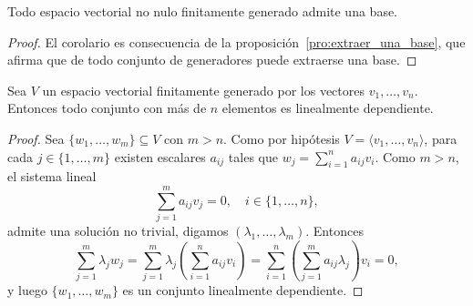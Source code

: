 \begin{cor}
	Todo espacio vectorial no nulo finitamente generado admite una base. 		

	\begin{proof}
		El corolario es consecuencia de la
		proposición~\ref{pro:extraer_una_base}, que afirma que de todo conjunto
		de generadores puede extraerse una base.
	\end{proof}
\end{cor}

\begin{thm}
	\label{thm:>n_es_LD}
	Sea $V$ un espacio vectorial finitamente generado por los vectores $v_1,\dots,v_n$.
	Entonces todo conjunto con más de $n$ elementos es linealmente dependiente. 

	\begin{proof}
		Sea $\{w_1,\dots,w_m\}\subseteq V$ con $m>n$. Como por hipótesis $V=\langle
		v_1,\dots,v_n\rangle$, para cada $j\in\{1,\dots,m\}$ existen escalares
		$a_{ij}$ tales que $w_j=\sum_{i=1}^n a_{ij}v_i$. Como $m>n$, el sistema lineal 
		\[
		\sum_{j=1}^m a_{ij}v_j=0,\quad i\in\{1,\dots,n\},
		\]
		admite una solución no trivial, digamos $(\lambda_1,\dots,\lambda_m)$. Entonces
		\[
		\sum_{j=1}^m \lambda_jw_j=\sum_{j=1}^m\lambda_{j}\left( \sum_{i=1}^na_{ij}v_i\right)=\sum_{i=1}^n\left(\sum_{j=1}^ma_{ij}\lambda_j\right)v_i=0,
		\]
		y luego $\{w_1,\dots,w_m\}$ es un conjunto linealmente dependiente. 
	\end{proof}
\end{thm}

